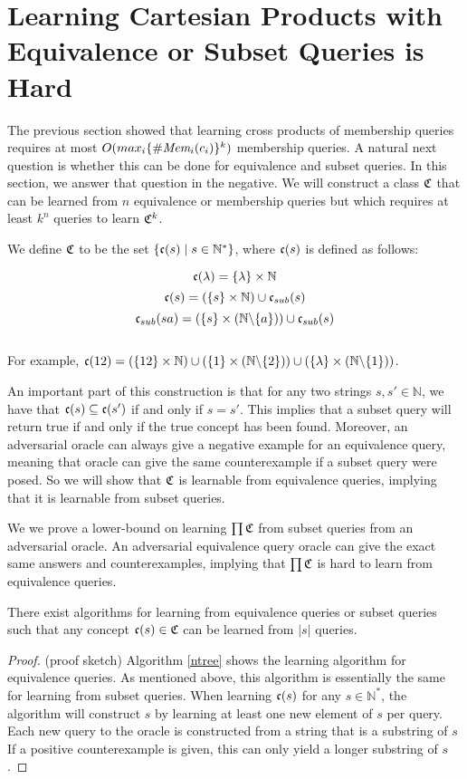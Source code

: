 \documentclass[11pt]{amsart}
\begin{document}
\section{Learning Cartesian Products with Equivalence or Subset Queries is Hard}


The previous section showed that learning cross products of membership queries requires at most $O(max_i \{ \#\emph{Mem}_{i}(c_i) \}^k)$ membership queries. 
A natural next question is whether this can be done for equivalence and subset queries. 
In this section, we answer that question in the negative. 
We will construct a class $\mathfrak{C}$ that can be learned from $n$ equivalence or membership queries but which requires at least $k^n$ queries to learn $\mathfrak{C}^k$.  

We define $\mathfrak{C}$ to be the set $\{ \mathfrak{c}(s) \mid s \in \mathbb{N}^* \}$, where $\mathfrak{c}(s)$ is defined as follows:

\[\mathfrak{c}(\lambda) = \{\lambda\} \times \mathbb{N}\]
\[\mathfrak{c}(s) = (\{s\} \times \mathbb{N}) \cup \mathfrak{c}_{sub}(s)\]
\[\mathfrak{c}_{sub}(sa) = (\{s\} \times (\mathbb{N} \backslash \{a\})) \cup \mathfrak{c}_{sub}(s)\]\\

For example, $\mathfrak{c}(12) = (\{12\} \times \mathbb{N}) \cup (\{1\}\times(\mathbb{N} \backslash \{2\}))\cup(\{\lambda\} \times (\mathbb{N} \backslash \{1\}))$.


An important part of this construction is that for any two strings $s,s' \in \mathbb{N}$, we have that $\mathfrak{c}(s) \subseteq \mathfrak{c}(s')$ if and only if $s = s'$. 
This implies that a subset query will return true if and only if the true concept has been found. 
Moreover, an adversarial oracle can always give a negative example for an equivalence query, meaning that oracle can give the same counterexample if a subset query were posed. 
So we will show that $\mathfrak{C}$ is learnable from equivalence queries, implying that it is learnable from subset queries. 

We we prove a lower-bound on learning $\prod \mathfrak{C}$ from subset queries from an adversarial oracle. 
An adversarial equivalence query oracle can give the exact same answers and counterexamples, implying that  $\prod \mathfrak{C}$ is hard to learn from equivalence queries. 

\begin{proposition}
There exist algorithms for learning from equivalence queries or subset queries such that any concept $\mathfrak{c}(s) \in \mathfrak{C}$ can be learned from $|s|$ queries. 
\end{proposition}
\begin{proof}
(proof sketch) Algorithm \ref{ntree} shows the learning algorithm for equivalence queries. 
As mentioned above, this algorithm is essentially the same for learning from subset queries. 
When learning $\mathfrak{c}(s)$ for any $s \in \mathbb{N}^*$, the algorithm will construct $s$ by learning at least one new element of $s$ per query. 
Each new query to the oracle is constructed from a string that is a substring of $s$
If a positive counterexample is given, this can only yield a longer substring of $s$.
\end{proof}
\end{document}
